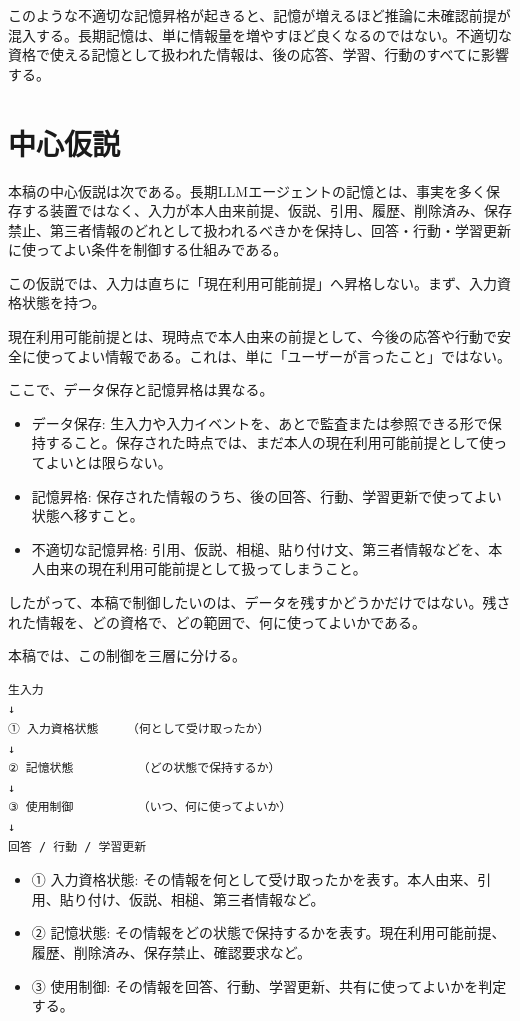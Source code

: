\documentclass[12pt,a4paper]{article}
\begin{document}
このような不適切な記憶昇格が起きると、記憶が増えるほど推論に未確認前提が混入する。長期記憶は、単に情報量を増やすほど良くなるのではない。不適切な資格で使える記憶として扱われた情報は、後の応答、学習、行動のすべてに影響する。

\section{中心仮説}\label{ux4e2dux5fc3ux4eeeux8aac}

本稿の中心仮説は次である。長期LLMエージェントの記憶とは、事実を多く保存する装置ではなく、入力が本人由来前提、仮説、引用、履歴、削除済み、保存禁止、第三者情報のどれとして扱われるべきかを保持し、回答・行動・学習更新に使ってよい条件を制御する仕組みである。

この仮説では、入力は直ちに「現在利用可能前提」へ昇格しない。まず、入力資格状態を持つ。

現在利用可能前提とは、現時点で本人由来の前提として、今後の応答や行動で安全に使ってよい情報である。これは、単に「ユーザーが言ったこと」ではない。

ここで、データ保存と記憶昇格は異なる。

\begin{itemize}
\tightlist
\item
  データ保存: 生入力や入力イベントを、あとで監査または参照できる形で保持すること。保存された時点では、まだ本人の現在利用可能前提として使ってよいとは限らない。
\item
  記憶昇格: 保存された情報のうち、後の回答、行動、学習更新で使ってよい状態へ移すこと。
\item
  不適切な記憶昇格: 引用、仮説、相槌、貼り付け文、第三者情報などを、本人由来の現在利用可能前提として扱ってしまうこと。
\end{itemize}

したがって、本稿で制御したいのは、データを残すかどうかだけではない。残された情報を、どの資格で、どの範囲で、何に使ってよいかである。

本稿では、この制御を三層に分ける。

\begin{verbatim}
生入力
↓
① 入力資格状態    （何として受け取ったか）
↓
② 記憶状態         （どの状態で保持するか）
↓
③ 使用制御         （いつ、何に使ってよいか）
↓
回答 / 行動 / 学習更新
\end{verbatim}

\begin{itemize}
\tightlist
\item
  ① 入力資格状態: その情報を何として受け取ったかを表す。本人由来、引用、貼り付け、仮説、相槌、第三者情報など。
\item
  ② 記憶状態: その情報をどの状態で保持するかを表す。現在利用可能前提、履歴、削除済み、保存禁止、確認要求など。
\item
  ③ 使用制御: その情報を回答、行動、学習更新、共有に使ってよいかを判定する。
\end{itemize}
\end{document}
